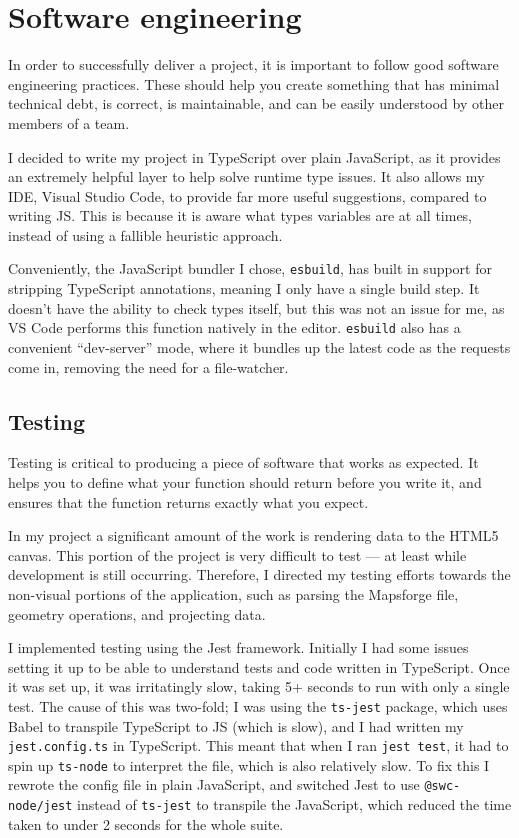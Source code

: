\documentclass[hyphens]{final_report}
\begin{document}
\clearpage
\chapter{Software engineering}\label{sec:software-engineering}

In order to successfully deliver a project, it is important to follow good software engineering practices. These should help you create something that has minimal technical debt, is correct, is maintainable, and can be easily understood by other members of a team.

I decided to write my project in TypeScript over plain JavaScript, as it provides an extremely helpful layer to help solve runtime type issues. It also allows my IDE, Visual Studio Code, to provide far more useful suggestions, compared to writing JS\@. This is because it is aware what types variables are at all times, instead of using a fallible heuristic approach.

Conveniently, the JavaScript bundler I chose, \texttt{esbuild}, has built in support for stripping TypeScript annotations, meaning I only have a single build step. It doesn't have the ability to check types itself, but this was not an issue for me, as VS Code performs this function natively in the editor. \texttt{esbuild} also has a convenient ``dev-server'' mode, where it bundles up the latest code as the requests come in, removing the need for a file-watcher.

\section{Testing}

Testing is critical to producing a piece of software that works as expected. It helps you to define what your function should return before you write it, and ensures that the function returns exactly what you expect.

In my project a significant amount of the work is rendering data to the HTML5 canvas. This portion of the project is very difficult to test --- at least while development is still occurring. Therefore, I directed my testing efforts towards the non-visual portions of the application, such as parsing the Mapsforge file, geometry operations, and projecting data.

I implemented testing using the Jest framework. Initially I had some issues setting it up to be able to understand tests and code written in TypeScript. Once it was set up, it was irritatingly slow, taking 5+ seconds to run with only a single test. The cause of this was two-fold; I was using the \texttt{ts-jest} package, which uses Babel to transpile TypeScript to JS (which is slow), and I had written my \texttt{jest.config.ts} in TypeScript. This meant that when I ran \texttt{jest test}, it had to spin up \texttt{ts-node} to interpret the file, which is also relatively slow. To fix this I rewrote the config file in plain JavaScript, and switched Jest to use \texttt{@swc-node/jest} instead of \texttt{ts-jest} to transpile the JavaScript, which reduced the time taken to under 2 seconds for the whole suite.
\end{document}
